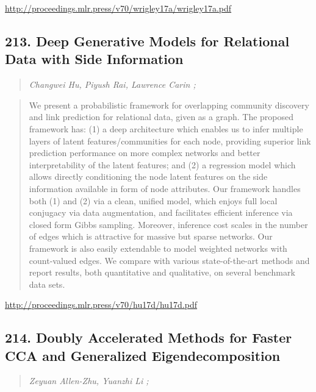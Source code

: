 \documentclass{article}
\begin{document}
\href{http://proceedings.mlr.press/v70/wrigley17a/wrigley17a.pdf}{http://proceedings.mlr.press/v70/wrigley17a/wrigley17a.pdf}

\subsection{213. Deep Generative Models for Relational Data with Side Information}

\begin{quote}
\footnotesize{\textit{Changwei Hu, Piyush Rai, Lawrence Carin ;}}

\end{quote}

\begin{quote}
    We present a probabilistic framework for overlapping community discovery and link prediction for relational data, given as a graph. The proposed framework has: (1) a deep architecture which enables us to infer multiple layers of latent features/communities for each node, providing superior link prediction performance on more complex networks and better interpretability of the latent features; and (2) a regression model which allows directly conditioning the node latent features on the side information available in form of node attributes. Our framework handles both (1) and (2) via a clean, unified model, which enjoys full local conjugacy via data augmentation, and facilitates efficient inference via closed form Gibbs sampling. Moreover, inference cost scales in the number of edges which is attractive for massive but sparse networks. Our framework is also easily extendable to model weighted networks with count-valued edges. We compare with various state-of-the-art methods and report results, both quantitative and qualitative, on several benchmark data sets.  
\end{quote}

\href{http://proceedings.mlr.press/v70/hu17d/hu17d.pdf}{http://proceedings.mlr.press/v70/hu17d/hu17d.pdf}

\subsection{214. Doubly Accelerated Methods for Faster CCA and Generalized Eigendecomposition}

\begin{quote}
\footnotesize{\textit{Zeyuan Allen-Zhu, Yuanzhi Li ;}}

\end{quote}
\end{document}
